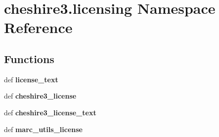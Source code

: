 \hypertarget{namespacecheshire3_1_1licensing}{\section{cheshire3.\-licensing Namespace Reference}
\label{namespacecheshire3_1_1licensing}
}
\subsection*{Functions}
\begin{DoxyCompactItemize}
\item 
\hypertarget{namespacecheshire3_1_1licensing_a5f4c8624f27ec9eb57664cf5fbbaa924}{def {\bfseries license\-\_\-text}}\label{namespacecheshire3_1_1licensing_a5f4c8624f27ec9eb57664cf5fbbaa924}

\item 
\hypertarget{namespacecheshire3_1_1licensing_a96314080dd60600b0df61cfe3696432b}{def {\bfseries cheshire3\-\_\-license}}\label{namespacecheshire3_1_1licensing_a96314080dd60600b0df61cfe3696432b}

\item 
\hypertarget{namespacecheshire3_1_1licensing_ac068b068674a5acce791bef9b6546190}{def {\bfseries cheshire3\-\_\-license\-\_\-text}}\label{namespacecheshire3_1_1licensing_ac068b068674a5acce791bef9b6546190}

\item 
\hypertarget{namespacecheshire3_1_1licensing_a79c453b70f4556acbd74c877099061c1}{def {\bfseries marc\-\_\-utils\-\_\-license}}\label{namespacecheshire3_1_1licensing_a79c453b70f4556acbd74c877099061c1}

\end{DoxyCompactItemize}


